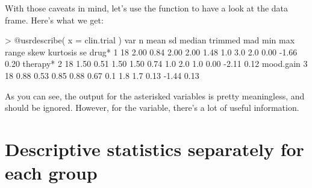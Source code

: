 With those caveats in mind, let's use the  function to have a look at the  data frame. Here's what we get:
\begin{rblock1}
> @usr{describe( x = clin.trial )}
          var  n mean   sd median trimmed  mad min max range skew kurtosis   se
drug*       1 18 2.00 0.84   2.00    2.00 1.48 1.0 3.0   2.0 0.00    -1.66 0.20
therapy*    2 18 1.50 0.51   1.50    1.50 0.74 1.0 2.0   1.0 0.00    -2.11 0.12
mood.gain   3 18 0.88 0.53   0.85    0.88 0.67 0.1 1.8   1.7 0.13    -1.44 0.13
\end{rblock1}
As you can see, the output for the asterisked variables is pretty meaningless, and should be ignored. However, for the  variable, there's a lot of useful information. 

\section{Descriptive statistics separately for each group~\label{sec:groupdescriptives}}


